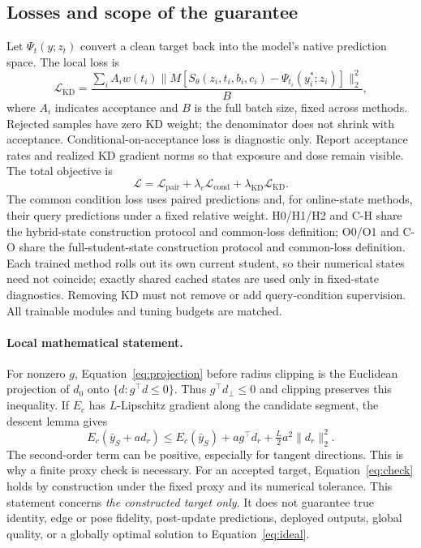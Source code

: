 \documentclass{article}
\begin{document}
\subsection{Losses and scope of the guarantee}
Let $\Psi_t(y;z_t)$ convert a clean target back into the model's native prediction space. The local loss is
\begin{equation}
 \mathcal L_{\mathrm{KD}}=
 \frac{\sum_i A_i w(t_i)\|M[S_\theta(z_i,t_i,b_i,c_i)-\Psi_{t_i}(y_i^*;z_i)]\|_2^2}
 {B},
\end{equation}
where $A_i$ indicates acceptance and $B$ is the full batch size, fixed across methods. Rejected samples have zero KD weight; the denominator does not shrink with acceptance. Conditional-on-acceptance loss is diagnostic only. Report acceptance rates and realized KD gradient norms so that exposure and dose remain visible. The total objective is
\begin{equation}
 \mathcal L=\mathcal L_{\mathrm{pair}}+
 \lambda_c\mathcal L_{\mathrm{cond}}+
 \lambda_{\mathrm{KD}}\mathcal L_{\mathrm{KD}}.
\end{equation}
The common condition loss uses paired predictions and, for online-state methods, their query predictions under a fixed relative weight. H0/H1/H2 and C-H share the hybrid-state construction protocol and common-loss definition; O0/O1 and C-O share the full-student-state construction protocol and common-loss definition. Each trained method rolls out its own current student, so their numerical states need not coincide; exactly shared cached states are used only in fixed-state diagnostics. Removing KD must not remove or add query-condition supervision. All trainable modules and tuning budgets are matched.

\paragraph{Local mathematical statement.}
For nonzero $g$, Equation~\ref{eq:projection} before radius clipping is the Euclidean projection of $d_0$ onto $\{d:g^\top d\le0\}$. Thus $g^\top d_{\perp}\le0$ and clipping preserves this inequality. If $E_c$ has $L$-Lipschitz gradient along the candidate segment, the descent lemma gives
\begin{equation}
 E_c(\bar y_S+a d_r)\le E_c(\bar y_S)+
 a g^\top d_r+\tfrac{L}{2}a^2\|d_r\|_2^2.
\end{equation}
The second-order term can be positive, especially for tangent directions. This is why a finite proxy check is necessary. For an accepted target, Equation~\ref{eq:check} holds by construction under the fixed proxy and its numerical tolerance. This statement concerns \emph{the constructed target only}. It does not guarantee true identity, edge or pose fidelity, post-update predictions, deployed outputs, global quality, or a globally optimal solution to Equation~\ref{eq:ideal}.
\end{document}
